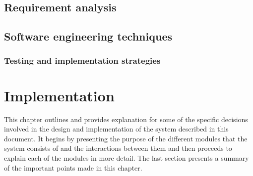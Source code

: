 \documentclass[12pt,a4paper,twoside,openright]{report}
\begin{document}
\section{}

\section{Requirement analysis}

\section{Software engineering techniques}
\subsection{Testing and implementation strategies}


\chapter{Implementation}
This chapter outlines and provides explanation for some of the specific decisions involved in the design and implementation of the system described in this document. It begins by presenting the purpose of the different modules that the system consists of and the interactions between them and then proceeds to explain each of the modules in more detail. The last section presents a summary of the important points made in this chapter.
\end{document}
